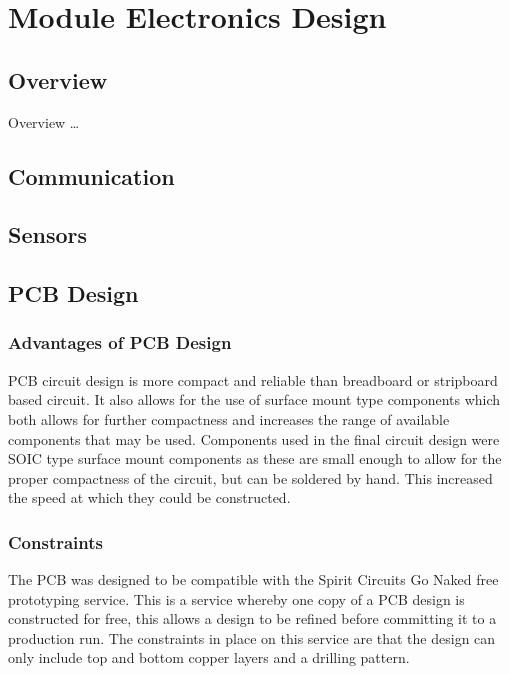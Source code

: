 \chapter{Module Electronics Design} \label{Chapter:ModuleElecDesign}

\section{Overview}
Overview \dots

\section{Communication}





\section{Sensors}



\section{PCB Design}
\subsection{Advantages of PCB Design}
PCB circuit design is more compact and reliable than breadboard or stripboard based circuit. It also allows for the use of surface mount type components which both allows for further compactness and increases the range of available components that may be used.
Components used in the final circuit design were SOIC type surface mount components as these are small enough to allow for the proper compactness of the circuit, but can be soldered by hand. This increased the speed at which they could be constructed.

\subsection{Constraints}
The PCB was designed to be compatible with the Spirit Circuits Go Naked free prototyping service. This is a service whereby one copy of a PCB design is constructed for free, this allows a design to be refined before committing it to a production run. The constraints in place on this service are that the design can only include top and bottom copper layers and a drilling pattern.

